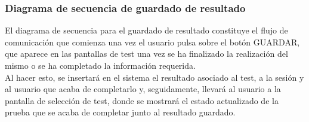 
\subsubsection{Diagrama de secuencia de guardado de resultado}

El diagrama de secuencia para el guardado de resultado constituye el flujo de comunicación que comienza una vez el usuario pulsa sobre el botón GUARDAR, que aparece en las pantallas de test una vez se ha finalizado la realización del mismo o se ha completado la información requerida.\\

Al hacer esto, se insertará en el sistema el resultado asociado al test, a la sesión y al usuario que acaba de completarlo y, seguidamente, llevará al usuario a la pantalla de selección de test, donde se mostrará el estado actualizado de la prueba que se acaba de completar junto al resultado guardado.\\

